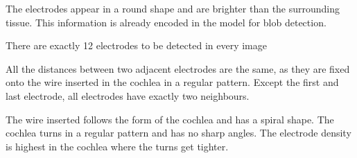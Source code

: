 \documentclass[a4paper, 11pt]{article}
\begin{document}
\begin{description}[] %
\item[Electrode shape and intensity] The electrodes appear in a round shape and are brighter than the surrounding tissue. This information is already encoded in the model for blob detection.
\item[Electrode count] There are exactly 12 electrodes to be detected in every image
\item[Equidistance] All the distances between two adjacent electrodes are the same, as they are fixed onto the wire inserted in the cochlea in a regular pattern. Except the first and last electrode, all electrodes have exactly two neighbours. 
\item[Spiral shape] The wire inserted follows the form of the cochlea and has a spiral shape. The cochlea turns in a regular pattern and has no sharp angles. The electrode density is highest in the cochlea where the turns get tighter.
\end{description}
\end{document}
